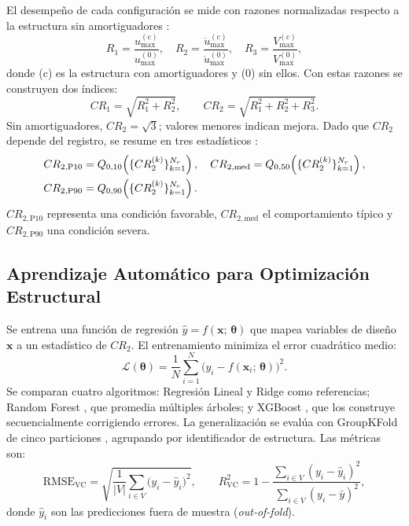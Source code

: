 \documentclass[preprint,12pt,authoryear]{elsarticle}
\newcommand{\CR}[1]{CR_{2,\text{#1}}}
\newcommand{\RMSE}{\mathrm{RMSE_{VC}}}
\newcommand{\Rsq}{R^{2}_{\mathrm{VC}}}
\begin{document}
El desempeño de cada configuración se mide con razones normalizadas respecto
a la estructura sin amortiguadores
\citep{Namorado2024, Jarrahi2020jbe, Mualla2002}:
\begin{equation}
    R_1 = \frac{u_{\max}^{(\mathrm{c})}}{u_{\max}^{(0)}}, \quad
    R_2 = \frac{\ddot{u}_{\max}^{(\mathrm{c})}}{\ddot{u}_{\max}^{(0)}}, \quad
    R_3 = \frac{V_{\max}^{(\mathrm{c})}}{V_{\max}^{(0)}},
    \label{eq:R_individual}
\end{equation}
donde (c) es la estructura con amortiguadores y (0) sin ellos. Con estas
razones se construyen dos índices:
\begin{equation}
    CR_1 = \sqrt{R_1^2 + R_2^2}, \qquad
    CR_2 = \sqrt{R_1^2 + R_2^2 + R_3^2}.
    \label{eq:CR}
\end{equation}
Sin amortiguadores, $CR_2 = \sqrt{3}$; valores menores indican mejora. Dado
que $CR_2$ depende del registro, se resume en tres estadísticos
\citep{Kazemi2022}:
\begin{align}
    \CR{P10} &= Q_{0{,}10}\!\left(\{CR_2^{(k)}\}_{k=1}^{N_r}\right), \quad
    \CR{med}  = Q_{0{,}50}\!\left(\{CR_2^{(k)}\}_{k=1}^{N_r}\right), \notag\\
    \CR{P90} &= Q_{0{,}90}\!\left(\{CR_2^{(k)}\}_{k=1}^{N_r}\right).
    \label{eq:CR2stats}
\end{align}
$\CR{P10}$ representa una condición favorable, $\CR{med}$ el comportamiento
típico y $\CR{P90}$ una condición severa.

\subsection{Aprendizaje Automático para Optimización Estructural}
\label{sec:theory:ml}

Se entrena una función de regresión $\hat{y} = f(\bm{x};\,\bm{\theta})$ que
mapea variables de diseño $\bm{x}$ a un estadístico de $CR_2$. El
entrenamiento minimiza el error cuadrático medio:
\begin{equation}
    \mathcal{L}(\bm{\theta}) = \frac{1}{N}\sum_{i=1}^{N}
    \bigl(y_i - f(\bm{x}_i;\,\bm{\theta})\bigr)^2.
    \label{eq:mse}
\end{equation}
Se comparan cuatro algoritmos: Regresión Lineal y Ridge como referencias;
Random Forest \citep{Breiman2001}, que promedia múltiples árboles; y XGBoost
\citep{Chen2016}, que los construye secuencialmente corrigiendo errores. La
generalización se evalúa con GroupKFold de cinco particiones
\citep{Kazemi2022}, agrupando por identificador de estructura. Las métricas
son:
\begin{equation}
    \RMSE = \sqrt{\frac{1}{|V|}\sum_{i \in V}\bigl(y_i - \hat{y}_i\bigr)^2},
    \qquad
    \Rsq  = 1 - \frac{\sum_{i \in V}(y_i - \hat{y}_i)^2}
                      {\sum_{i \in V}(y_i - \bar{y})^2},
    \label{eq:metrics}
\end{equation}
donde $\hat{y}_i$ son las predicciones fuera de muestra (\textit{out-of-fold}).
\end{document}
